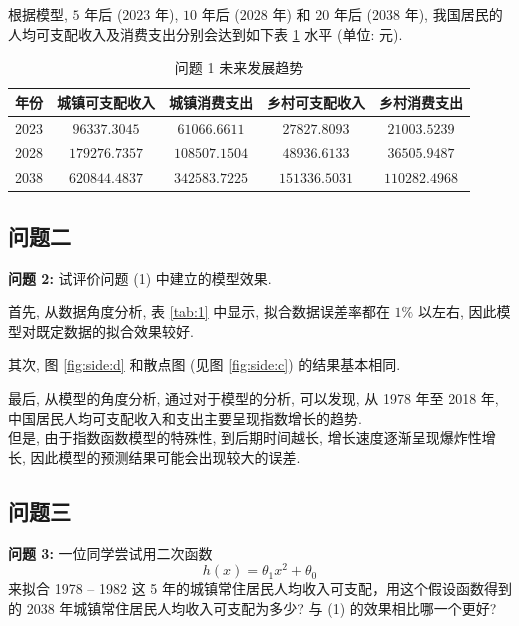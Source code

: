 \documentclass{article}
\begin{document}
\par 根据模型, $5$ 年后 ($2023$ 年), $10$ 年后 ($2028$ 年) 和 $20$ 年后 ($2038$ 年), 我国居民的人均可支配收入及消费支出分别会达到如下表 \ref{tab:2} 水平 (单位: 元).

\begin{table}[H]
  \centering
  \caption{问题 1 未来发展趋势}
  \label{tab:2}
  \begin{tabular}{ccccc}
    \hline
    \textbf{年份} & \textbf{城镇可支配收入} & \textbf{城镇消费支出} & \textbf{乡村可支配收入} & \textbf{乡村消费支出} \\
    \hline
    2023 & $96337.3045$ & $61066.6611$ & $27827.8093$ & $21003.5239$ \\
    2028 & $179276.7357$ & $108507.1504$ & $48936.6133$ & $36505.9487$ \\
    2038 & $620844.4837$ & $342583.7225$ & $151336.5031$ & $110282.4968$ \\
    \hline
  \end{tabular}
\end{table}

\subsection{问题二}

\begin{mdframed}
\fangsong
\textbf{问题 2:} 试评价问题 (1) 中建立的模型效果.
\end{mdframed}

\par 首先, 从数据角度分析, 表 \ref{tab:1} 中显示, 拟合数据误差率都在 $1\%$ 以左右, 因此模型对既定数据的拟合效果较好.\\
\par 其次, 图 \ref{fig:side:d} 和散点图 (见图 \ref{fig:side:c}) 的结果基本相同.\\
\par 最后, 从模型的角度分析, 通过对于模型的分析, 可以发现, 从 1978 年至 2018 年, 中国居民人均可支配收入和支出主要呈现指数增长的趋势.\\

但是, 由于指数函数模型的特殊性, 到后期时间越长, 增长速度逐渐呈现爆炸性增长, 因此模型的预测结果可能会出现较大的误差.\\

\subsection{问题三}

\begin{mdframed}
\fangsong
\textbf{问题 3:} 一位同学尝试用二次函数
\begin{equation}
  \label{eq:2}
  h\left(x\right)=\theta_1 x^2+\theta_0
\end{equation}
来拟合 1978 -- 1982 这 5 年的城镇常住居民人均收入可支配，用这个假设函数得到的 2038 年城镇常住居民人均收入可支配为多少? 与 (1) 的效果相比哪一个更好?
\end{mdframed}
\end{document}
